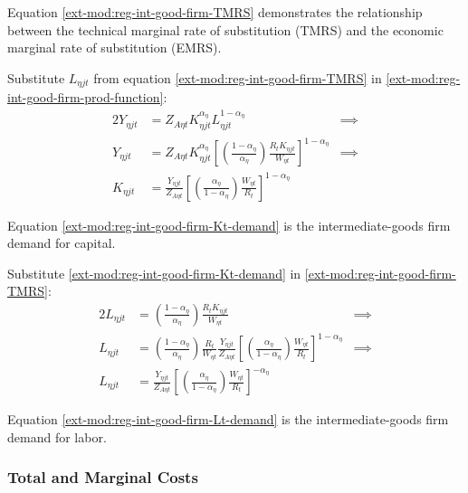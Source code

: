 \documentclass[../thesis.tex]{subfiles}
\begin{document}
Equation \ref{ext-mod:reg-int-good-firm-TMRS} demonstrates the relationship between the technical marginal rate of substitution (TMRS) and the economic marginal rate of substitution (EMRS). 

Substitute $L_{\eta jt}$ from equation \ref{ext-mod:reg-int-good-firm-TMRS} in \ref{ext-mod:reg-int-good-firm-prod-function}:
\begin{alignat}{2}
	Y_{\eta jt} & = Z_{A\eta t} K_{\eta jt}^{\alpha_{\eta}} L_{\eta jt}^{1-\alpha_{\eta}} &\implies \nonumber \\
	Y_{\eta jt} & = Z_{A\eta t} K_{\eta jt}^{\alpha_{\eta}} \left[ \left( \frac{1-\alpha_{\eta}}{{\alpha_{\eta}}} \right) \frac{R_{t} K_{\eta jt}}{W_{\eta t}} \right]^{1-\alpha_{\eta}} &\implies \nonumber \\
	K_{\eta jt} & = \frac{Y_{\eta jt}}{Z_{A\eta t}} \left[ \left( \frac{{\alpha_{\eta}}}{1-\alpha_{\eta}} \right) \frac{W_{\eta t}}{R_{t}}\right]^{1-\alpha_{\eta}} \label{ext-mod:reg-int-good-firm-Kt-demand}
\end{alignat}

Equation \ref{ext-mod:reg-int-good-firm-Kt-demand} is the intermediate-goods firm demand for capital. 

Substitute \ref{ext-mod:reg-int-good-firm-Kt-demand} in \ref{ext-mod:reg-int-good-firm-TMRS}:
\begin{alignat}{2}
	L_{\eta jt} & = \left( \frac{1-\alpha_{\eta}}{{\alpha_{\eta}}} \right) \frac{R_{t} K_{\eta jt}}{W_{\eta t}} &\implies \nonumber \\
	L_{\eta jt} & = \left( \frac{1-\alpha_{\eta}}{{\alpha_{\eta}}} \right) \frac{R_{t}}{W_{\eta t}} \frac{Y_{\eta jt}}{Z_{A\eta t}} \left[ \left( \frac{{\alpha_{\eta}}}{1-\alpha_{\eta}} \right) \frac{W_{\eta t}}{R_{t}}\right]^{1-\alpha_{\eta}} &\implies \nonumber \\
	L_{\eta jt} & = \frac{Y_{\eta jt}}{Z_{A\eta t}} \left[ \left( \frac{{\alpha_{\eta}}}{1-\alpha_{\eta}} \right) \frac{W_{\eta t}}{R_{t}}\right]^{-{\alpha_{\eta}}} \label{ext-mod:reg-int-good-firm-Lt-demand}
\end{alignat}

Equation \ref{ext-mod:reg-int-good-firm-Lt-demand} is the intermediate-goods firm demand for labor.

\subsubsection*{Total and Marginal Costs}
\end{document}
